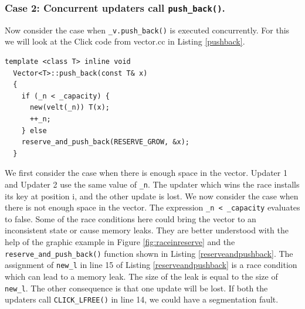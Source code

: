 \documentclass[a4paper]{article}
\begin{document}
\subsubsection{Case 2: Concurrent updaters call \texttt{push\_back()}. }
Now consider the case when \texttt{\_v.push\_back()} is executed concurrently. For this we will look at the Click code from vector.cc in Listing \ref{pushback}.
\begin{lstlisting}[caption = The push\_back() function, label=pushback]
  template <class T> inline void
  Vector<T>::push_back(const T& x)
  {
    if (_n < _capacity) {
      new(velt(_n)) T(x);
      ++_n;
    } else
    reserve_and_push_back(RESERVE_GROW, &x);
  }
\end{lstlisting}
We first consider the case when there is enough space in the vector. Updater 1 and Updater 2 use the same value of \verb+_n+. The updater which wins the race installs its key at position i, and the other update is lost.
We now consider the case when there is not enough space in the vector. The expression \verb$_n < _capacity$ evaluates to false. Some of the race conditions here could bring the vector to an inconsistent state or cause memory leaks. They are better understood with the help of the graphic example in Figure \ref{fig:raceinreserve} and the \texttt{reserve\_and\_push\_back()} function shown in Listing \ref{reserveandpushback}. The assignment of \verb+new_l+ in line 15 of Listing \ref{reserveandpushback} is a race condition which can lead to a memory leak. The size of the leak is equal to the size of \verb+new_l+. The other consequence is that one update will be lost. If both the updaters call \texttt{CLICK\_LFREE()} in line 14, we could have a segmentation fault.
\end{document}
